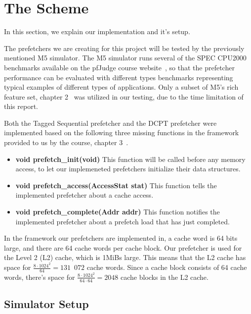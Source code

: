 \section{The Scheme}

In this section, we explain our implementation and it's setup.

The prefetchers we are creating for this project will be tested by the
previously mentioned M5 simulator. The M5 simulator runs several of the SPEC
CPU2000 benchmarks available on the pfJudge course website~\cite{guidelines}, so
that the prefetcher performance can be evaluated with different types benchmarks
representing typical examples of different types of applications. Only a subset
of M5's rich feature set, chapter 2~\cite{user_doc} was utilized in our testing,
due to the time limitation of this report.

Both the Tagged Sequential prefetcher and the DCPT prefetcher were implemented
based on the following three missing functions in the framework provided to us
by the course, chapter 3~\cite{user_doc}.
\begin{itemize}
	\item \textbf{void prefetch\_init(void)}
		This function will be called before any memory access, to let our
		implemeneted prefetchers initialize their data structures.
	\item \textbf{void prefetch\_access(AccessStat stat)}
		This function tells the implemented prefetcher about a cache access.
	\item \textbf{void prefetch\_complete(Addr addr)}
		This function notifies the implemented prefetcher about a prefetch load
		that has just completed.
\end{itemize}

In the framework our prefetchers are implemented in, a cache word is 64 bits
large, and there are 64 cache words per cache block. Our prefetcher is used for
the Level 2 (L2) cache, which is 1MiBs large. This means that the L2 cache has
space for $\frac{8 \cdot 1024^{2}}{64} = 131$~$072$ cache words. Since a cache
block consists of 64 cache words, there's space for $\frac{8 \cdot 1024^{2}}{64
\cdot 64} = 2048$ cache blocks in the L2 cache.

\subsection{Simulator Setup}


